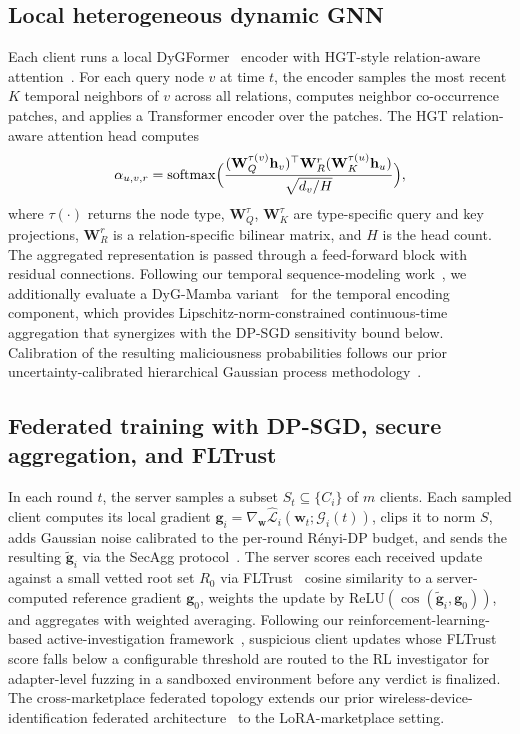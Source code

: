\documentclass[12pt,a4paper]{article}
\theoremstyle{definition}
\theoremstyle{remark}
\newcommand{\Lcal}{\mathcal{L}}
\newcommand{\Gcal}{\mathcal{G}}
\DeclareMathOperator{\softmax}{softmax}
\begin{document}
\subsection{Local heterogeneous dynamic GNN}
\label{subsec:dgnn}

Each client runs a local DyGFormer~\cite{yu2023dygformer} encoder with HGT-style relation-aware attention~\cite{hu2020hgt}. For each query node $v$ at time $t$, the encoder samples the most recent $K$ temporal neighbors of $v$ across all relations, computes neighbor co-occurrence patches, and applies a Transformer encoder over the patches. The HGT relation-aware attention head computes
\begin{equation}
    \alpha_{u, v, r} = \softmax\Bigl(\frac{(\mathbf{W}_Q^{\tau(v)} \mathbf{h}_v)^\top \mathbf{W}_R^r (\mathbf{W}_K^{\tau(u)} \mathbf{h}_u)}{\sqrt{d_v / H}}\Bigr),
\end{equation}
where $\tau(\cdot)$ returns the node type, $\mathbf{W}_Q^{\tau}$, $\mathbf{W}_K^{\tau}$ are type-specific query and key projections, $\mathbf{W}_R^r$ is a relation-specific bilinear matrix, and $H$ is the head count. The aggregated representation is passed through a feed-forward block with residual connections. Following our temporal sequence-modeling work~\cite{anaedevha2025mambashield,anaedevha2026tanode}, we additionally evaluate a DyG-Mamba variant~\cite{li2025dygmamba} for the temporal encoding component, which provides Lipschitz-norm-constrained continuous-time aggregation that synergizes with the DP-SGD sensitivity bound below. Calibration of the resulting maliciousness probabilities follows our prior uncertainty-calibrated hierarchical Gaussian process methodology~\cite{anaedevha2026uchgp}.

\subsection{Federated training with DP-SGD, secure aggregation, and FLTrust}
\label{subsec:federated}

In each round $t$, the server samples a subset $S_t \subseteq \{C_i\}$ of $m$ clients. Each sampled client computes its local gradient $\mathbf{g}_i = \nabla_{\mathbf{w}} \hat{\Lcal}_i(\mathbf{w}_t; \Gcal_i(t))$, clips it to norm $S$, adds Gaussian noise calibrated to the per-round R\'enyi-DP budget, and sends the resulting $\tilde{\mathbf{g}}_i$ via the SecAgg protocol~\cite{bonawitz2017practical}. The server scores each received update against a small vetted root set $R_0$ via FLTrust~\cite{cao2021fltrust} cosine similarity to a server-computed reference gradient $\mathbf{g}_0$, weights the update by $\mathrm{ReLU}(\cos(\tilde{\mathbf{g}}_i, \mathbf{g}_0))$, and aggregates with weighted averaging. Following our reinforcement-learning-based active-investigation framework~\cite{anaedevha2025dqn}, suspicious client updates whose FLTrust score falls below a configurable threshold are routed to the RL investigator for adapter-level fuzzing in a sandboxed environment before any verdict is finalized. The cross-marketplace federated topology extends our prior wireless-device-identification federated architecture~\cite{anaedevha2024wireless} to the LoRA-marketplace setting.
\end{document}
